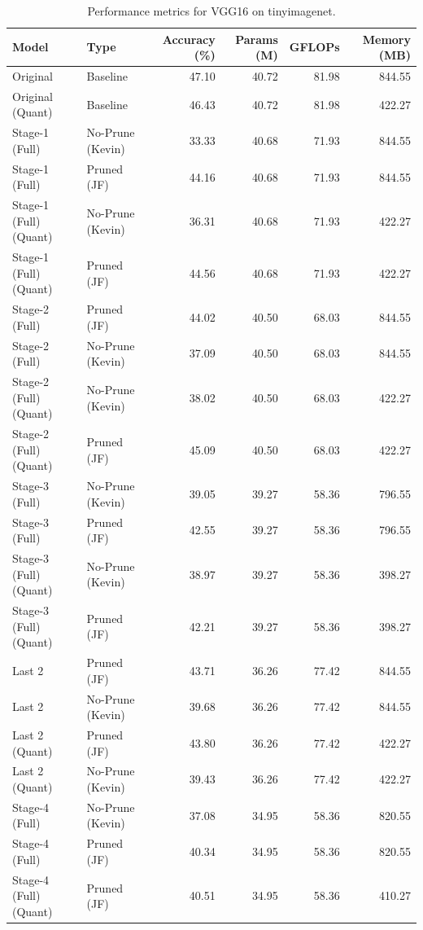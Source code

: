\begin{table}
\caption{Performance metrics for VGG16 on tinyimagenet.}
\label{tab:VGG16_tinyimagenet}
\begin{tabular}{llrrrr}
\toprule
Model & Type & Accuracy (\%) & Params (M) & GFLOPs & Memory (MB) \\
\midrule
Original & Baseline & 47.10 & 40.72 & 81.98 & 844.55 \\
Original
(Quant) & Baseline & 46.43 & 40.72 & 81.98 & 422.27 \\
Stage-1 (Full) & No-Prune (Kevin) & 33.33 & 40.68 & 71.93 & 844.55 \\
Stage-1 (Full) & Pruned (JF) & 44.16 & 40.68 & 71.93 & 844.55 \\
Stage-1 (Full)
(Quant) & No-Prune (Kevin) & 36.31 & 40.68 & 71.93 & 422.27 \\
Stage-1 (Full)
(Quant) & Pruned (JF) & 44.56 & 40.68 & 71.93 & 422.27 \\
Stage-2 (Full) & Pruned (JF) & 44.02 & 40.50 & 68.03 & 844.55 \\
Stage-2 (Full) & No-Prune (Kevin) & 37.09 & 40.50 & 68.03 & 844.55 \\
Stage-2 (Full)
(Quant) & No-Prune (Kevin) & 38.02 & 40.50 & 68.03 & 422.27 \\
Stage-2 (Full)
(Quant) & Pruned (JF) & 45.09 & 40.50 & 68.03 & 422.27 \\
Stage-3 (Full) & No-Prune (Kevin) & 39.05 & 39.27 & 58.36 & 796.55 \\
Stage-3 (Full) & Pruned (JF) & 42.55 & 39.27 & 58.36 & 796.55 \\
Stage-3 (Full)
(Quant) & No-Prune (Kevin) & 38.97 & 39.27 & 58.36 & 398.27 \\
Stage-3 (Full)
(Quant) & Pruned (JF) & 42.21 & 39.27 & 58.36 & 398.27 \\
Last 2 & Pruned (JF) & 43.71 & 36.26 & 77.42 & 844.55 \\
Last 2 & No-Prune (Kevin) & 39.68 & 36.26 & 77.42 & 844.55 \\
Last 2
(Quant) & Pruned (JF) & 43.80 & 36.26 & 77.42 & 422.27 \\
Last 2
(Quant) & No-Prune (Kevin) & 39.43 & 36.26 & 77.42 & 422.27 \\
Stage-4 (Full) & No-Prune (Kevin) & 37.08 & 34.95 & 58.36 & 820.55 \\
Stage-4 (Full) & Pruned (JF) & 40.34 & 34.95 & 58.36 & 820.55 \\
Stage-4 (Full)
(Quant) & Pruned (JF) & 40.51 & 34.95 & 58.36 & 410.27 \\

\end{tabular}
\end{table}
